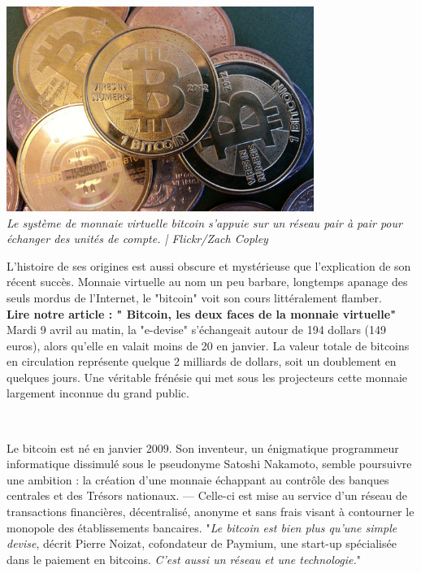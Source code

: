 \documentclass[11pt,twoside,a4paper]{article}
\begin{document}
\begin{minipage}[ht]{10.25cm}
	\includegraphics[width=10.00cm]{img/3156581_7_c614_le-systeme-de-monnaie-virtuelle-bitcoin_c7723fa59d263918a76b2f84261ccb14.jpg} ~\\
	\emph{Le syst{\`e}me de monnaie virtuelle bitcoin s'appuie sur un r{\'e}seau pair {\`a} pair pour {\'e}changer des unit{\'e}s de compte. | Flickr/Zach Copley}~\\
\end{minipage} \hfill \begin{minipage}[ht]{9.00cm}
	L'histoire de ses origines est aussi obscure et myst{\'e}rieuse que l'explication de son r{\'e}cent succ{\`e}s. Monnaie virtuelle au nom un peu barbare, longtemps apanage des seuls mordus de l'Internet, le "bitcoin" voit son cours litt{\'e}ralement flamber. ~\\
	
	\textbf{Lire notre article : " Bitcoin, les deux faces de la monnaie virtuelle"\footnotemark}~\\ 

	Mardi 9 avril au matin, la "e-devise" s'{\'e}changeait autour de 194 dollars (149 euros), alors qu'elle en valait moins de 20 en janvier. La valeur totale de bitcoins en circulation repr{\'e}sente quelque 2 milliards de dollars, soit un doublement en quelques jours. Une v{\'e}ritable fr{\'e}n{\'e}sie qui met sous les projecteurs cette monnaie largement inconnue du grand public. ~\\		
\end{minipage}~\\

Le bitcoin est n{\'e} en janvier 2009. Son inventeur, un {\'e}nigmatique programmeur informatique dissimul{\'e} sous le pseudonyme Satoshi Nakamoto, semble poursuivre une ambition : la cr{\'e}ation d'une monnaie {\'e}chappant au contr{\^o}le des banques centrales et des Tr{\'e}sors nationaux. --- Celle-ci est mise au service d'un r{\'e}seau de transactions financi{\`e}res, d{\'e}centralis{\'e}, anonyme et sans frais visant {\`a} contourner le monopole des {\'e}tablissements bancaires. "\emph{Le bitcoin est bien plus qu'une simple devise}, d{\'e}crit Pierre Noizat, cofondateur de Paymium, une start-up sp{\'e}cialis{\'e}e dans le paiement en bitcoins. \emph{C'est aussi un r{\'e}seau et une technologie.}" ~\\
\end{document}
